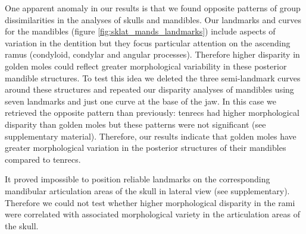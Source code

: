 \documentclass[12pt,a4paper]{article}
\begin{document}
	
	One apparent anomaly in our results is that we found opposite patterns of group dissimilarities in the analyses of skulls and mandibles. 
	Our landmarks and curves for the mandibles (figure \ref{fig:sklat_mands_landmarks}) include aspects of variation in the dentition but they focus particular attention on the ascending ramus (condyloid, condylar and angular processes). Therefore higher disparity in golden moles could reflect greater morphological variability in these posterior mandible structures. To test this idea we deleted the three semi-landmark curves around these structures and repeated our disparity analyses of mandibles using seven landmarks and just one curve at the base of the jaw. In this case we retrieved the opposite pattern than previously: tenrecs had higher morphological disparity than golden moles but these patterns were not significant (see supplementary material). Therefore, our results indicate that golden moles have greater morphological variation in the posterior structures of their mandibles compared to tenrecs.
	
		
 	It proved impossible to position reliable landmarks on the corresponding mandibular articulation areas of the skull in lateral view (see supplementary). Therefore we could not test whether higher morphological disparity in the rami were correlated with associated morphological variety in the articulation areas of the skull.
	
	

\end{document}
